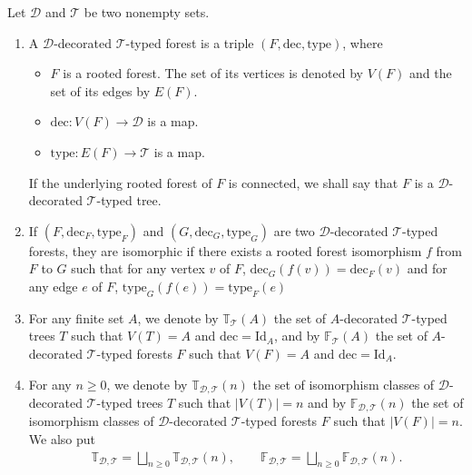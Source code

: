 \documentclass[10pt,a4paper]{amsart}
\numberwithin{equation}{section}
\newcommand{\T}{\mathcal{T}}
\newcommand{\D}{\mathcal{D}}
\newcommand{\bfT}{\mathbb{T}}
\newcommand{\bfF}{\mathbb{F}}
\newcommand{\dec}{\mathrm{dec}}
\newcommand{\id}{\mathrm{Id}}
\newcommand{\type}{\mathrm{type}}
\begin{document}
\begin{Definition}
Let $\D$ and $\T$ be two nonempty sets.
\begin{enumerate}\itemsep=0pt
\item A $\D$-decorated $\T$-typed forest is a triple $(F,\dec,\type)$, where
\begin{itemize}\itemsep=0pt
\item $F$ is a rooted forest. The set of its vertices is denoted by $V(F)$ and the set of its edges by $E(F)$.
\item $\dec\colon V(F)\longrightarrow \D$ is a map.
\item $\type\colon E(F)\longrightarrow \T$ is a map.
\end{itemize}
If the underlying rooted forest of $F$ is connected, we shall say that $F$ is a $\D$-decorated $\T$-typed tree.
\item If $(F,\dec_F,\type_F)$ and $(G,\dec_G,\type_G)$ are two $\D$-decorated $\T$-typed forests,
they are isomorphic if there exists a rooted forest isomorphism $f$ from $F$ to $G$ such that for any vertex $v$ of $F$,
$\dec_G(f(v))=\dec_F(v)$ and for any edge $e$ of $F$, $\type_G(f(e))=\type_F(e)$
\item For any finite set $A$, we denote by $\bfT_\T(A)$ the set of $A$-decorated
$\T$-typed trees $T$ such that $V(T)=A$
and $\dec=\id_A$, and by $\bfF_\T(A)$ the set of $A$-decorated $\T$-typed forests $F$ such that $V(F)=A$ and $\dec=\id_A$.
\item For any $n\geq 0$, we denote by $\bfT_{\D,\T}(n)$ the set of isomorphism classes of $\D$-decorated $\T$-typed trees $T$
such that $|V(T)|=n$ and by $\bfF_{\D,\T}(n)$ the set of isomorphism classes of $\D$-decorated $\T$-typed forests $F$
such that $|V(F)|=n$.
We also put
\begin{gather*}
\bfT_{\D,\T}=\bigsqcup_{n\geq 0} \bfT_{\D,\T}(n),\qquad
\bfF_{\D,\T}=\bigsqcup_{n\geq 0} \bfF_{\D,\T}(n).
\end{gather*}
\end{enumerate}
\end{Definition}
\end{document}
